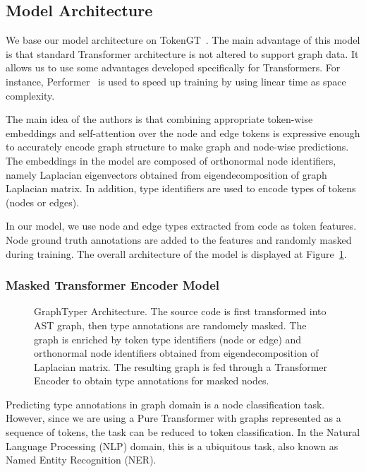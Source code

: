 \subsection{Model Architecture}\label{subsec:model-architecture}

We base our model architecture on TokenGT~\cite{kim_pure_2022}.
The main advantage of this model is that standard Transformer architecture is not altered to support graph data.
It allows us to use some advantages developed specifically for Transformers.
For instance, Performer~\cite{choromanski_rethinking_2020} is used to speed up training by using linear time as space complexity.

The main idea of the authors is that combining appropriate token-wise embeddings and self-attention over the node and edge tokens
is expressive enough to accurately encode graph structure to make graph and node-wise predictions.
The embeddings in the model are composed of orthonormal node identifiers, namely Laplacian eigenvectors obtained from
eigendecomposition of graph Laplacian matrix.
In addition, type identifiers are used to encode types of tokens (nodes or edges).

In our model, we use node and edge types extracted from code as token features.
Node ground truth annotations are added to the features and randomly masked during training.
The overall architecture of the model is displayed at Figure~\ref{fig:model}.

\subsubsection{Masked Transformer Encoder Model}

\begin{figure}[t]
    \resizebox{\textwidth}{!}{}
    \caption{GraphTyper Architecture. The source code is first transformed into AST graph, then type annotations are randomely masked. The graph is enriched by token type identifiers (node or edge) and orthonormal node identifiers obtained from eigendecomposition of Laplacian matrix. The resulting graph is fed through a Transformer Encoder to obtain type annotations for masked nodes.}
    \label{fig:model}
\end{figure}

Predicting type annotations in graph domain is a node classification task.
However, since we are using a Pure Transformer with graphs represented as a sequence of tokens, the task can be reduced to token classification.
In the Natural Language Processing (NLP) domain, this is a ubiquitous task, also known as Named Entity Recognition (NER).

